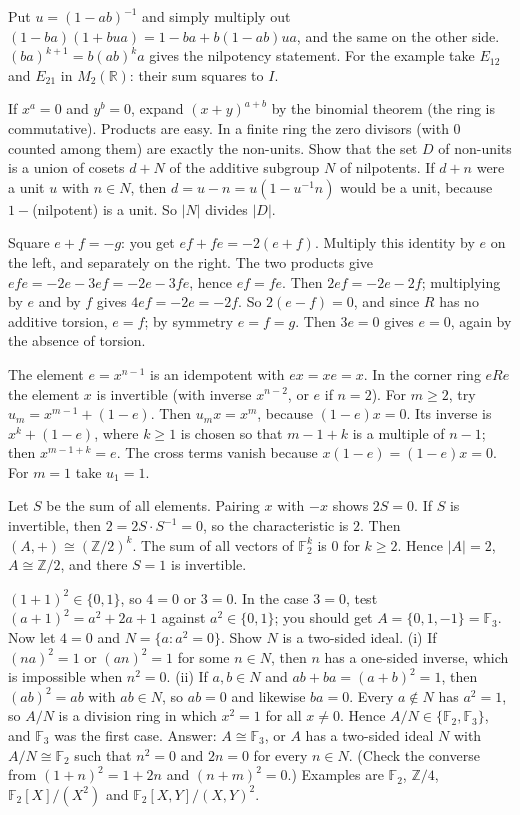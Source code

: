 \documentclass[11pt,a4paper]{article}
\begin{document}

 Put $u=(1-ab)^{-1}$ and simply multiply out $(1-ba)(1+bua)=1-ba+b(1-ab)ua$, and the same on the other side.
 $(ba)^{k+1}=b(ab)^ka$ gives the nilpotency statement. For the example take $E_{12}$ and $E_{21}$ in $M_2(\mathbb R)$: their sum squares to $I$.

 If $x^a=0$ and $y^b=0$, expand $(x+y)^{a+b}$ by the binomial theorem (the ring is commutative). Products are easy.
 In a finite ring the zero divisors (with $0$ counted among them) are exactly the non-units. Show that the set $D$ of non-units is a union of cosets $d+N$ of the additive subgroup $N$ of nilpotents.
 If $d+n$ were a unit $u$ with $n\in N$, then $d=u-n=u(1-u^{-1}n)$ would be a unit, because $1-$(nilpotent) is a unit. So $|N|$ divides $|D|$.

 Square $e+f=-g$: you get $ef+fe=-2(e+f)$. Multiply this identity by $e$ on the left, and separately on the right.
 The two products give $efe=-2e-3ef=-2e-3fe$, hence $ef=fe$. Then $2ef=-2e-2f$; multiplying by $e$ and by $f$ gives $4ef=-2e=-2f$.
 So $2(e-f)=0$, and since $R$ has no additive torsion, $e=f$; by symmetry $e=f=g$. Then $3e=0$ gives $e=0$, again by the absence of torsion.

 The element $e=x^{n-1}$ is an idempotent with $ex=xe=x$. In the corner ring $eRe$ the element $x$ is invertible (with inverse $x^{n-2}$, or $e$ if $n=2$).
 For $m\ge2$, try $u_m=x^{m-1}+(1-e)$. Then $u_mx=x^m$, because $(1-e)x=0$.
 Its inverse is $x^k+(1-e)$, where $k\ge1$ is chosen so that $m-1+k$ is a multiple of $n-1$; then $x^{m-1+k}=e$. The cross terms vanish because $x(1-e)=(1-e)x=0$. For $m=1$ take $u_1=1$.

 Let $S$ be the sum of all elements. Pairing $x$ with $-x$ shows $2S=0$. If $S$ is invertible, then $2=2S\cdot S^{-1}=0$, so the characteristic is $2$.
 Then $(A,+)\cong(\mathbb Z/2)^k$. The sum of all vectors of $\mathbb F_2^k$ is $0$ for $k\ge2$. Hence $|A|=2$, $A\cong\mathbb Z/2$, and there $S=1$ is invertible.

 $(1+1)^2\in\{0,1\}$, so $4=0$ or $3=0$. In the case $3=0$, test $(a+1)^2=a^2+2a+1$ against $a^2\in\{0,1\}$; you should get $A=\{0,1,-1\}=\mathbb F_3$.
 Now let $4=0$ and $N=\{a:a^2=0\}$. Show $N$ is a two-sided ideal. (i) If $(na)^2=1$ or $(an)^2=1$ for some $n\in N$, then $n$ has a one-sided inverse, which is impossible when $n^2=0$. (ii) If $a,b\in N$ and $ab+ba=(a+b)^2=1$, then $(ab)^2=ab$ with $ab\in N$, so $ab=0$ and likewise $ba=0$.
 Every $a\notin N$ has $a^2=1$, so $A/N$ is a division ring in which $x^2=1$ for all $x\ne0$. Hence $A/N\in\{\mathbb F_2,\mathbb F_3\}$, and $\mathbb F_3$ was the first case.
 Answer: $A\cong\mathbb F_3$, or $A$ has a two-sided ideal $N$ with $A/N\cong\mathbb F_2$ such that $n^2=0$ and $2n=0$ for every $n\in N$. (Check the converse from $(1+n)^2=1+2n$ and $(n+m)^2=0$.) Examples are $\mathbb F_2$, $\mathbb Z/4$, $\mathbb F_2[X]/(X^2)$ and $\mathbb F_2[X,Y]/(X,Y)^2$.
\end{document}
